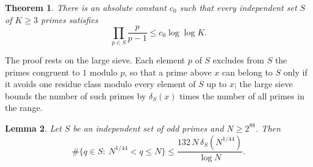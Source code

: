 \documentclass[11pt,reqno]{amsart}
\numberwithin{equation}{section}
\theoremstyle{plain}
\newtheorem{theorem}{Theorem}[section]
\newtheorem{lemma}[theorem]{Lemma}
\theoremstyle{definition}
\theoremstyle{remark}
\begin{document}
\begin{theorem}\label{thm:sieve}
There is an absolute constant $c_0$ such that every independent set
$S$ of $K\ge3$ primes satisfies
\[
  \prod_{p\in S}\frac p{p-1}\le c_0\log\log K .
\]
\end{theorem}

The proof rests on the large sieve. Each element $p$ of $S$ excludes
from $S$ the primes congruent to $1$ modulo $p$, so that a prime above
$x$ can belong to $S$ only if it avoids one residue class modulo every
element of $S$ up to $x$; the large sieve bounds the number of such
primes by $\delta_S(x)$ times the number of all primes in the range.

\begin{lemma}\label{lem:sievestep}
Let $S$ be an independent set of odd primes and $N\ge2^{88}$. Then
\[
  \#\{q\in S:\ N^{1/44}<q\le N\}\le\frac{132\,N\,\delta_S(N^{1/44})}{\log N}.
\]
\end{lemma}
\end{document}
